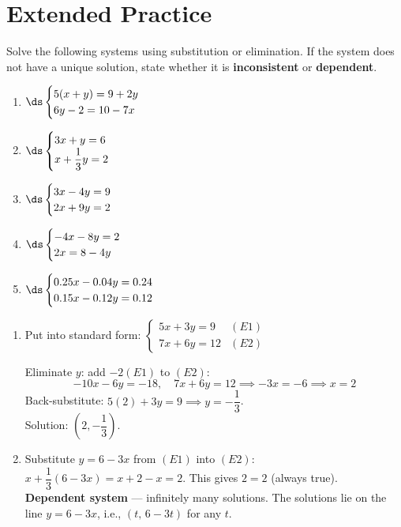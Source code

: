 \documentclass{ximera}
\begin{document}
\bigskip
\section*{Extended Practice}

\begin{problem}
Solve the following systems using substitution or elimination. If the system does not have a unique solution, state whether it is \textbf{inconsistent} or \textbf{dependent}.
\begin{enumerate}
  \item[(a)] $\ds\begin{cases} 5(x+y) = 9+2y\\ 6y - 2 = 10-7x \end{cases}$
  \medskip
  \item[(b)] $\ds\begin{cases} 3x+y = 6\\ x+\dfrac{1}{3}y = 2 \end{cases}$
  \medskip
  \item[(c)] $\ds\begin{cases} 3x-4y = 9\\ 2x+9y = 2 \end{cases}$
  \medskip
  \item[(d)] $\ds\begin{cases} -4x - 8y = 2\\ 2x = 8 - 4y \end{cases}$
  \medskip
  \item[(e)] $\ds\begin{cases} 0.25x - 0.04y = 0.24\\ 0.15x - 0.12y = 0.12 \end{cases}$
\end{enumerate}

\begin{solution}
\begin{enumerate}
  \item[(a)] Put into standard form: $\begin{cases} 5x+3y=9 & (E1)\\ 7x+6y=12 & (E2) \end{cases}$

  Eliminate $y$: add $-2(E1)$ to $(E2)$:
  $$-10x-6y=-18,\quad 7x+6y=12 \implies -3x=-6 \implies x=2$$
  Back-substitute: $5(2)+3y=9 \implies y=-\dfrac{1}{3}$.\\
  Solution: $\left(2,-\dfrac{1}{3}\right)$.

  \item[(b)] Substitute $y=6-3x$ from $(E1)$ into $(E2)$: $x+\dfrac{1}{3}(6-3x)=x+2-x=2$. This gives $2=2$ (always true).\\
  \textbf{Dependent system} — infinitely many solutions. The solutions lie on the line $y=6-3x$, i.e., $(t,\,6-3t)$ for any $t$.


\end{enumerate}
\end{solution}
\end{problem}
\end{document}
